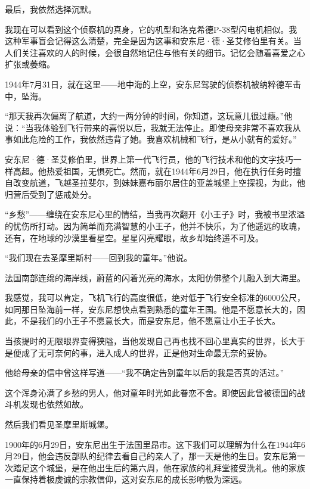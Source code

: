 最后，我依然选择沉默。

我现在可以看到这个侦察机的真身，它的机型和洛克希德P-38型闪电机相似。我这种军事盲会记得这么清楚，完全是因为这事和安东尼·德·圣艾修伯里有关。当人们关注喜欢的人的时候，会很自然地记住与他有关的细节。记忆会随着喜爱之心扩张或萎缩。

1944年7月31日，就在这里------地中海的上空，安东尼驾驶的侦察机被纳粹德军击中，坠海。

“那天我再次偏离了航道，大约一两分钟的时间，你知道，这玩意儿很过瘾。”他说：“当我体验到飞行带来的喜悦以后，我就无法停止。即使母亲非常不喜欢我从事如此危险的工作，我依然违背了她。我喜欢机械和飞行，是从小就有的爱好。”

安东尼·德·圣艾修伯里，世界上第一代飞行员，他的飞行技术和他的文字技巧一样高超。他热爱祖国，无惧死亡。然而，就在1944年6月29日，他在执行任务时擅自改变航道，飞越圣拉斐尔，到妹妹嘉布丽尔居住的亚盖城堡上空探视，为此，他归营后受到了惩戒处分。

“乡愁”------缠绕在安东尼心里的情结，当我再次翻开《小王子》时，我被书里浓溢的忧伤所打动。因为简单而充满智慧的小王子，他并不快乐，为了他遥远的玫瑰，还有，在地球的沙漠里看星空。星星闪亮耀眼，故乡却始终遥不可及。

“我们现在去圣摩里斯村------回到我的童年。”他说。

法国南部连绵的海岸线，蔚蓝的闪着光亮的海水，太阳仿佛整个儿融入到大海里。

我感觉，我可以肯定，飞机飞行的高度很低，绝对低于飞行安全标准的6000公尺，如同那日坠海前一样，安东尼想快点看到熟悉的童年王国。他是不愿意长大的，因此，不是我们的小王子不愿意长大，而是安东尼，他不愿意让小王子长大。

当孩提时的无限眼界变得狭隘，当他发现自己再也找不回心里真实的世界，长大于是便成了无可奈何的事，进入成人的世界，正是他对生命最无奈的妥协。

他给母亲的信中曾这样写道------“我不确定告别童年以后的我是否真的活过。”

这个浑身沁满了乡愁的男人，他对童年时光如此眷恋不舍。即使因此曾被德国的战斗机发现也依然如故。


\stoptitle

\starttitle[title={2}]

然后我们看见圣摩里斯城堡。

1900年的6月29日，安东尼出生于法国里昂市。这下我们可以理解为什么在1944年6月29日，他会违反部队的纪律去看自己的亲人了，那一天是他的生日。安东尼第一次踏足这个城堡，是在他出生后的第六周，他在家族的礼拜堂接受洗礼。他的家族一直保持着极虔诚的宗教信仰，这对安东尼的成长影响极为深远。

